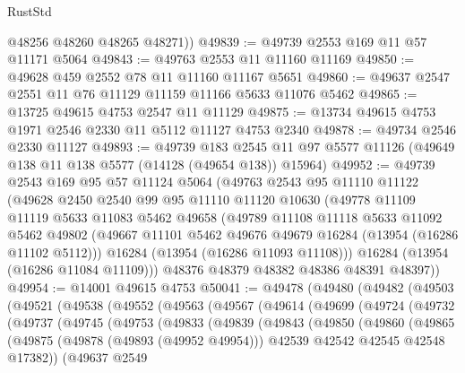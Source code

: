 \begin{lexlean}{RustStd}
\begin{coremodule}
        @48256
        @48260
        @48265
        @48271))
@49839 := @49739 @2553 @169 @11 @57 @11171 @5064
@49843 := @49763 @2553 @11 @11160 @11169
@49850 := @49628 @459 @2552 @78 @11 @11160 @11167 @5651
@49860 := @49637 @2547 @2551 @11 @76 @11129 @11159 @11166 @5633 @11076 @5462
@49865 := @13725 @49615 @4753 @2547 @11 @11129
@49875 := @13734 @49615 @4753 @1971 @2546 @2330 @11 @5112 @11127 @4753 @2340
@49878 := @49734 @2546 @2330 @11127
@49893 := @49739
    @183
    @2545
    @11
    @97
    @5577
    @11126
    (@49649 @138 @11 @138 @5577 (@14128 (@49654 @138)) @15964)
@49952 := @49739
    @2543
    @169
    @95
    @57
    @11124
    @5064
    (@49763
      @2543
      @95
      @11110
      @11122
      (@49628
        @2450
        @2540
        @99
        @95
        @11110
        @11120
        @10630
        (@49778
          @11109
          @11119
          @5633
          @11083
          @5462
          @49658
          (@49789
            @11108
            @11118
            @5633
            @11092
            @5462
            @49802
            (@49667 @11101 @5462 @49676 @49679 @16284 (@13954 (@16286 @11102 @5112)))
            @16284
            (@13954 (@16286 @11093 @11108)))
          @16284
          (@13954 (@16286 @11084 @11109)))
        @48376
        @48379
        @48382
        @48386
        @48391
        @48397))
@49954 := @14001 @49615 @4753
@50041 := @49478
    (@49480
      (@49482
        (@49503
          (@49521
            (@49538
              (@49552
                (@49563
                  (@49567
                    (@49614
                      (@49699
                        (@49724
                          (@49732
                            (@49737
                              (@49745
                                (@49753
                                  (@49833
                                    (@49839
                                      (@49843
                                        (@49850
                                          (@49860
                                            (@49865
                                              (@49875
                                                (@49878 (@49893 (@49952 @49954)))
                                                @42539
                                                @42542
                                                @42545
                                                @42548
                                                @17382))
                                            (@49637
                                              @2549

\end{coremodule}
\end{lexlean}
